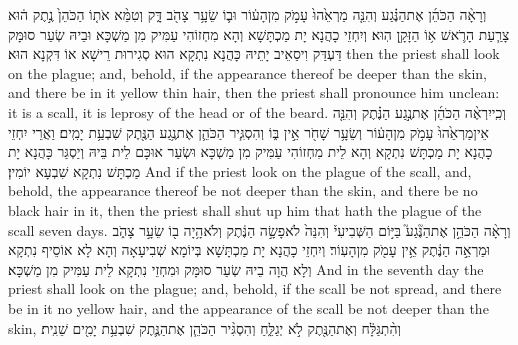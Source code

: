 {וְרָאָ֨ה הַכֹּהֵ֜ן אֶת\maqqaf הַנֶּ֗גַע וְהִנֵּ֤ה מַרְאֵ֙הוּ֙ עָמֹ֣ק מִן\maqqaf הָע֔וֹר וּב֛וֹ שֵׂעָ֥ר צָהֹ֖ב דָּ֑ק וְטִמֵּ֨א אֹת֤וֹ הַכֹּהֵן֙ נֶ֣תֶק ה֔וּא צָרַ֧עַת הָרֹ֛אשׁ א֥וֹ הַזָּקָ֖ן הֽוּא׃}
{וְיִחְזֵי כָהֲנָא יָת מַכְתָּשָׁא וְהָא מִחְזוֹהִי עַמִּיק מִן מַשְׁכָּא וּבֵיהּ שְׂעַר סוּמָּק דַּעְדַּק וִיסַאֵיב יָתֵיהּ כָּהֲנָא נִתְקָא הוּא סְגִירוּת רֵישָׁא אוֹ דִּקְנָא הוּא׃}
{then the priest shall look on the plague; and, behold, if the appearance thereof be deeper than the skin, and there be in it yellow thin hair, then the priest shall pronounce him unclean: it is a scall, it is leprosy of the head or of the beard.}{}
{וְכִֽי\maqqaf יִרְאֶ֨ה הַכֹּהֵ֜ן אֶת\maqqaf נֶ֣גַע הַנֶּ֗תֶק וְהִנֵּ֤ה אֵין\maqqaf מַרְאֵ֙הוּ֙ עָמֹ֣ק מִן\maqqaf הָע֔וֹר וְשֵׂעָ֥ר שָׁחֹ֖ר אֵ֣ין בּ֑וֹ וְהִסְגִּ֧יר הַכֹּהֵ֛ן אֶת\maqqaf נֶ֥גַע הַנֶּ֖תֶק שִׁבְעַ֥ת יָמִֽים׃}
{וַאֲרֵי יִחְזֵי כָהֲנָא יָת מַכְתָּשׁ נִתְקָא וְהָא לֵית מִחְזוֹהִי עַמִּיק מִן מַשְׁכָּא וּשְׂעַר אוּכָּם לֵית בֵּיהּ וְיַסְגַּר כָּהֲנָא יָת מַכְתָּשׁ נִתְקָא שִׁבְעָא יוֹמִין׃}
{And if the priest look on the plague of the scall, and, behold, the appearance thereof be not deeper than the skin, and there be no black hair in it, then the priest shall shut up him that hath the plague of the scall seven days.}{}
{וְרָאָ֨ה הַכֹּהֵ֣ן אֶת\maqqaf הַנֶּ֘גַע֮ בַּיּ֣וֹם הַשְּׁבִיעִי֒ וְהִנֵּה֙ לֹא\maqqaf פָשָׂ֣ה הַנֶּ֔תֶק וְלֹא\maqqaf הָ֥יָה ב֖וֹ שֵׂעָ֣ר צָהֹ֑ב וּמַרְאֵ֣ה הַנֶּ֔תֶק אֵ֥ין עָמֹ֖ק מִן\maqqaf הָעֽוֹר׃}
{וְיִחְזֵי כָהֲנָא יָת מַכְתָּשָׁא בְּיוֹמָא שְׁבִיעָאָה וְהָא לָא אוֹסֵיף נִתְקָא וְלָא הֲוָה בֵיהּ שְׂעַר סוּמָּק וּמִחְזֵי נִתְקָא לֵית עַמִּיק מִן מַשְׁכָּא׃}
{And in the seventh day the priest shall look on the plague; and, behold, if the scall be not spread, and there be in it no yellow hair, and the appearance of the scall be not deeper than the skin,}{}
{וְהִ֨תְ\large{גַּ}לָּ֔ח וְאֶת\maqqaf הַנֶּ֖תֶק לֹ֣א יְגַלֵּ֑חַ וְהִסְגִּ֨יר הַכֹּהֵ֧ן אֶת\maqqaf הַנֶּ֛תֶק שִׁבְעַ֥ת יָמִ֖ים שֵׁנִֽית׃}
